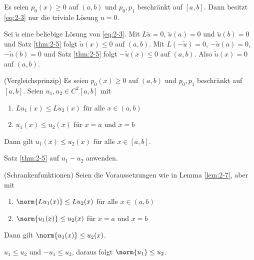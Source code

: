 \begin{lemma}\label{lem:2-6}
  Es seien $p_{0}(x) \geq 0$ auf $(a, b)$ und $p_{0}, p_{1}$ beschränkt auf $[a, b]$. Dann besitzt \eqref{eq:2-3} nur die triviale Lösung $u = 0$. 
\end{lemma}
\begin{beweis}
  Sei $\tilde u$ eine beliebige Lösung von \eqref{eq:2-3}. Mit $L \tilde u = 0$, $\tilde u (a) = 0$ und $\tilde u (b) = 0$  und Satz \ref{thm:2-5} folgt $\tilde u (x)\leq 0$ auf $(a, b)$. Mit $L(- \tilde u) = 0$, $-\tilde u(a) = 0$, $-\tilde u(b) = 0$ und Satz \ref{thm:2-5} folgt $-\tilde u(x) \leq 0$ auf $(a, b)$. 
Also $\tilde u(x) = 0$ auf $(a, b)$. 
\end{beweis}
\begin{lemma}\label{lem:2-7}(Vergleichsprinzip)
  Es seien $p_{0}(x) \geq 0$ auf $(a, b)$ und $p_{0}, p_{1}$ beschränkt auf $[a, b]$. Seien $u_{1}, u_{2} \in C^{2}[a, b]$ mit
  \begin{enumerate}
  \item $Lu_{1}(x) \leq Lu_{2}(x)$ für alle $x \in (a, b)$
  \item $u_{1}(x)\leq u_{2}(x)$ für $x = a$ und $x = b$
  \end{enumerate}
Dann gilt $u_{1}(x)\leq u_{2}(x)$ für alle $x \in [a, b]$. 
\end{lemma}
\begin{beweis}
  Satz \ref{thm:2-5} auf $u_{1} - u_{2}$ anwenden. 
\end{beweis}
\begin{lemma}\label{lem:2-8} (Schrankenfunktionen)
  Seien die Voraussetzungen wie in Lemma \ref{lem:2-7}, aber mit
  \begin{enumerate}
  \item $\norm{Lu_{1}(x)} \leq Lu_{2}(x)$ für alle $x \in (a, b)$ 
  \item $\norm{u_{1}(x)}\leq u_{2}(x)$ für $x = a$ und $x = b$
  \end{enumerate}
Dann gilt $\norm{u_{1}(x)}\leq u_{2}(x)$. 
\end{lemma}
\begin{beweis}
  $u_{1}\leq u_{2}$ und $-u_{1} \leq u_{2}$, daraus folgt $\norm{u_{1}}\leq u_{2}$. 
\end{beweis}
